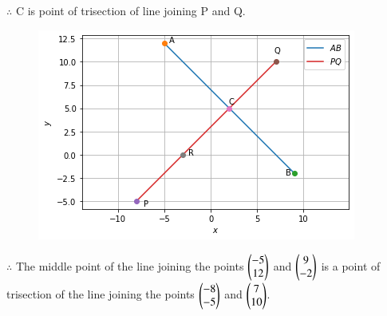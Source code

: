 \documentclass[journal,12pt,twocolumn]{IEEEtran}
\begin{document}
$\therefore$ C is point of trisection of line joining P and Q.

\begin{figure}[htp]
    \centering
    \includegraphics[width=\columnwidth]{a_1.png}
\end{figure}

$\therefore$ The middle point of the line joining the points $\begin{pmatrix}-5\\12\end{pmatrix}$ and $\begin{pmatrix}9\\-2\end{pmatrix}$ is a point of trisection of the line
joining the points $\begin{pmatrix}-8\\-5\end{pmatrix}$ and $\begin{pmatrix}7\\10\end{pmatrix}$.
\end{document}
